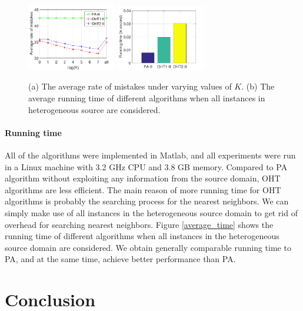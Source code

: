 \documentclass[letterpaper]{article}
\begin{document}
\begin{figure}[!htb]
\centering
  \subfigure
  {
    \label{average_error}
    \includegraphics[width=3.9cm]{average_error.pdf}
  }
  \subfigure
  {
    \label{average_time}
    \includegraphics[width=3.9cm]{average_time.pdf}
  }
  \caption{(a) The average rate of mistakes under varying values of $K$. (b) The average running time of different algorithms when all instances in heterogeneous source are considered.}
  \label{average eok}
\end{figure}

\paragraph{Running time}
All of the algorithms were implemented in Matlab, and all experiments were run in a Linux machine with 3.2 GHz CPU and 3.8 GB memory.
Compared to PA algorithm without exploiting any information from the source domain, OHT algorithms are less efficient.
The main reason of more running time for OHT algorithms is probably the searching process for the nearest neighbors.
We can simply make use of all instances in the heterogeneous source domain to get rid of overhead for searching nearest neighbors.
Figure \ref{average_time} shows the running time of different algorithms when all instances in the heterogeneous source domain are considered.
We obtain generally comparable running time to PA, and at the same time, achieve better performance than PA.

\section{Conclusion}
\end{document}
